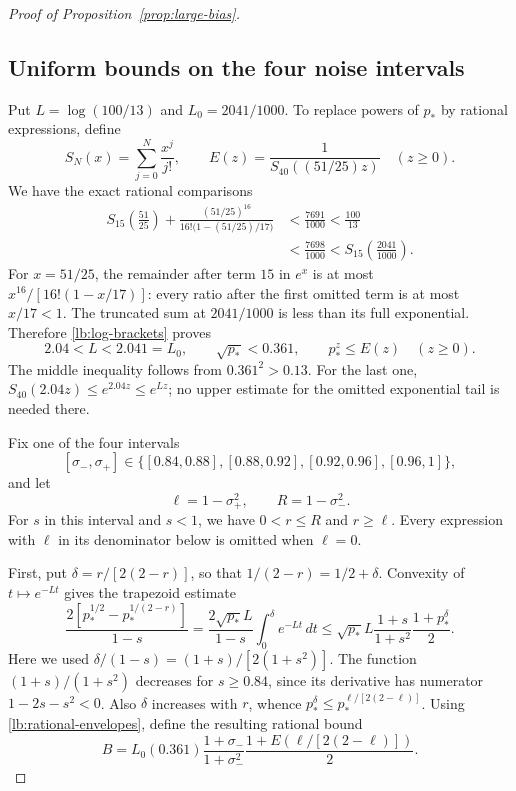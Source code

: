 \begin{proof}[Proof of Proposition~\ref{prop:large-bias}]
\subsection{Uniform bounds on the four noise intervals}

Put $L=\log(100/13)$ and $L_0=2041/1000$.
To replace powers of $p_*$ by rational expressions, define
\begin{equation}\label{lb:exponential-envelope}
 S_N(x)=\sum_{j=0}^N\frac{x^j}{j!},\qquad
 E(z)=\frac1{S_{40}((51/25)z)}\quad(z\ge0).
\end{equation}
We have the exact rational comparisons
\begin{equation}\label{lb:log-brackets}
 \begin{split}
 S_{15}\!\left(\frac{51}{25}\right)
 +\frac{(51/25)^{16}}{16!\bigl(1-(51/25)/17\bigr)}
 &<\frac{7691}{1000}<\frac{100}{13}\\
 &<\frac{7698}{1000}
 <S_{15}\!\left(\frac{2041}{1000}\right).
 \end{split}
\end{equation}
For $x=51/25$, the remainder after term $15$ in $e^x$ is at most
$x^{16}/[16!(1-x/17)]$: every ratio after the first omitted term is
at most $x/17<1$. The truncated sum at $2041/1000$ is less than its
full exponential. Therefore \eqref{lb:log-brackets} proves
\begin{equation}\label{lb:rational-envelopes}
 2.04<L<2.041=L_0,\qquad
 \sqrt{p_*}<0.361,\qquad p_*^z\le E(z)\quad(z\ge0).
\end{equation}
The middle inequality follows from $0.361^2>0.13$.
For the last one, $S_{40}(2.04z)\le e^{2.04z}\le e^{Lz}$;
no upper estimate for the omitted exponential tail is needed there.

Fix one of the four intervals
\begin{equation}\label{lb:noise-intervals}
 [\sigma_-,\sigma_+]
 \in\{[0.84,0.88],[0.88,0.92],[0.92,0.96],[0.96,1]\},
\end{equation}
and let
\[
 \ell=1-\sigma_+^2,\qquad R=1-\sigma_-^2.
\]
For $s$ in this interval and $s<1$, we have $0<r\le R$ and
$r\ge\ell$. Every expression with $\ell$ in its denominator below
is omitted when $\ell=0$.

First, put $\delta=r/[2(2-r)]$, so that $1/(2-r)=1/2+\delta$.
Convexity of $t\mapsto e^{-Lt}$ gives the trapezoid estimate
\[
 \frac{2[p_*^{1/2}-p_*^{1/(2-r)}]}{1-s}
 =\frac{2\sqrt{p_*}L}{1-s}\int_0^\delta e^{-Lt}\,dt
 \le\sqrt{p_*}L\frac{1+s}{1+s^2}
       \frac{1+p_*^\delta}{2}.
\]
Here we used $\delta/(1-s)=(1+s)/[2(1+s^2)]$.
The function $(1+s)/(1+s^2)$ decreases for $s\ge0.84$, since its
derivative has numerator $1-2s-s^2<0$.
Also $\delta$ increases with $r$, whence
$p_*^\delta\le p_*^{\ell/[2(2-\ell)]}$.
Using \eqref{lb:rational-envelopes}, define the resulting rational bound
\begin{equation}\label{lb:B}
 B=L_0(0.361)\frac{1+\sigma_-}{1+\sigma_-^2}
       \frac{1+E(\ell/[2(2-\ell)])}{2}.
\end{equation}


\end{proof}
